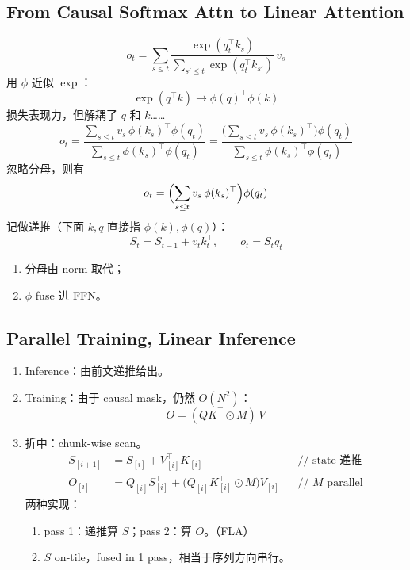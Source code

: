 \subsection{From Causal Softmax Attn to Linear Attention}

\begin{equation}
  o_t = \sum_{s \le t} \frac{\exp(q_t^\top k_s)}{\sum_{s' \le t} \exp(q_t^\top k_{s'})}\, v_s
\end{equation}
用 $\phi$ 近似 $\exp$：
\begin{equation}
  \exp(q^\top k) \to \phi(q)^\top \phi(k)
\end{equation}
损失表现力，但解耦了 $q$ 和 $k$……
\begin{equation}
  o_t = \frac{\sum_{s \le t} v_s\, \phi(k_s)^\top \phi(q_t)}{\sum_{s \le t} \phi(k_s)^\top \phi(q_t)}
      = \frac{\bigl(\sum_{s \le t} v_s\, \phi(k_s)^\top\bigr) \phi(q_t)}{\sum_{s \le t} \phi(k_s)^\top \phi(q_t)}
\end{equation}
忽略分母，则有
\begin{equation}
  o_t = \Bigl(\sum_{s \le t} v_s\, \phi(k_s)^\top\Bigr) \phi(q_t)
\end{equation}
记做递推（下面 $k, q$ 直接指 $\phi(k), \phi(q)$）：
\begin{equation}
  S_t = S_{t-1} + v_t k_t^\top, \qquad o_t = S_t q_t
\end{equation}
\begin{enumerate}
  \item 分母由 norm 取代；
  \item $\phi$ fuse 进 FFN。
\end{enumerate}

\subsection{Parallel Training, Linear Inference}

\begin{enumerate}
  \item Inference：由前文递推给出。
  \item Training：由于 causal mask，仍然 $O(N^2)$：
  \begin{equation}
    O = (QK^\top \odot M)\, V
  \end{equation}
  \item 折中：chunk-wise scan。
  \begin{align}
    S_{[i+1]} &= S_{[i]} + V_{[i]}^\top K_{[i]}
      && \text{// state 递推} \\
    O_{[i]} &= Q_{[i]} S_{[i]}^\top + \bigl(Q_{[i]} K_{[i]}^\top \odot M\bigr) V_{[i]}
      && \text{// $M$ parallel}
  \end{align}
  两种实现：
  \begin{enumerate}
    \item pass 1：递推算 $S$；pass 2：算 $O$。（FLA）
    \item $S$ on-tile，fused in 1 pass，相当于序列方向串行。
  \end{enumerate}
\end{enumerate}


